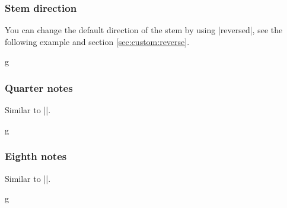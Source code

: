 \subsubsection{Stem direction}\label{sec:music-notes:commands:stem-direction}
You can change the default direction of the stem by using |reversed|, see the 
following example and section \ref{sec:custom:reverse}.
\begin{codeexample}[]
\begin{tmline}
\begin{tmstaff}{g}{}
\end{tmstaff}
\end{tmline}
\end{codeexample}
\subsubsection{Quarter notes}\label{sec:music-notes:commands:quarter}
\begin{command}{\tmquarter{}}
  Similar to |\tmhalf|.
\end{command}
\begin{codeexample}[]
\begin{tmline}%
\begin{tmstaff}{g}{}
           
        
\end{tmstaff}%
\end{tmline}
\end{codeexample}
\subsubsection{Eighth notes}\label{sec:music-notes:commands:eighth}
\begin{command}{\tmeighth{}}
  Similar to |\tmhalf|.
\end{command}
\begin{codeexample}[]
\begin{tmline}%
\begin{tmstaff}{g}{}
           
        
\end{tmstaff}%
\end{tmline}
\end{codeexample}
